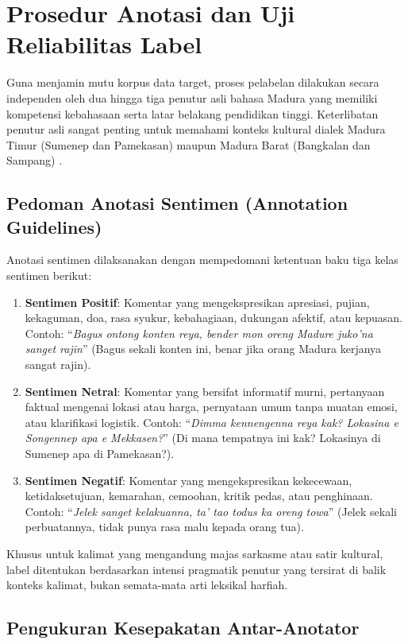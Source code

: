 \section{Prosedur Anotasi dan Uji Reliabilitas Label}

Guna menjamin mutu korpus data target, proses pelabelan dilakukan secara independen oleh dua hingga tiga penutur asli bahasa Madura yang memiliki kompetensi kebahasaan serta latar belakang pendidikan tinggi. Keterlibatan penutur asli sangat penting untuk memahami konteks kultural dialek Madura Timur (Sumenep dan Pamekasan) maupun Madura Barat (Bangkalan dan Sampang) \citep{cahyawijaya2023nusawrites, winata2023nusax}.

\subsection{Pedoman Anotasi Sentimen (Annotation Guidelines)}

Anotasi sentimen dilaksanakan dengan mempedomani ketentuan baku tiga kelas sentimen berikut:
\begin{enumerate}
    \item \textbf{Sentimen Positif}: Komentar yang mengekspresikan apresiasi, pujian, kekaguman, doa, rasa syukur, kebahagiaan, dukungan afektif, atau kepuasan. Contoh: ``\textit{Bagus ontong konten reya, bender mon oreng Madure juko'na sanget rajin}'' (Bagus sekali konten ini, benar jika orang Madura kerjanya sangat rajin).
    \item \textbf{Sentimen Netral}: Komentar yang bersifat informatif murni, pertanyaan faktual mengenai lokasi atau harga, pernyataan umum tanpa muatan emosi, atau klarifikasi logistik. Contoh: ``\textit{Dimma kennengenna reya kak? Lokasina e Songennep apa e Mekkasen?}'' (Di mana tempatnya ini kak? Lokasinya di Sumenep apa di Pamekasan?).
    \item \textbf{Sentimen Negatif}: Komentar yang mengekspresikan kekecewaan, ketidaksetujuan, kemarahan, cemoohan, kritik pedas, atau penghinaan. Contoh: ``\textit{Jelek sanget kelakuanna, ta' tao todus ka oreng towa}'' (Jelek sekali perbuatannya, tidak punya rasa malu kepada orang tua).
\end{enumerate}

Khusus untuk kalimat yang mengandung majas sarkasme atau satir kultural, label ditentukan berdasarkan intensi pragmatik penutur yang tersirat di balik konteks kalimat, bukan semata-mata arti leksikal harfiah.

\subsection{Pengukuran Kesepakatan Antar-Anotator}

